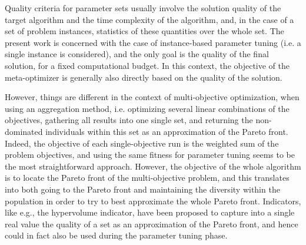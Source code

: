 \documentclass{llncs}
\begin{document}
Quality criteria for parameter sets usually involve the solution quality of the target algorithm and the time complexity of the algorithm, and, in the case of a set of problem instances, statistics of these quantities over the whole set. The present work is concerned with the case of instance-based parameter tuning (i.e. a single instance is considered), and the only goal is the quality of the final solution, for a fixed computational budget. In this context, the objective of the meta-optimizer is generally also directly based on the quality of the solution.

However, things are different in the context of multi-objective optimization, when using an aggregation method, i.e. optimizing several linear combinations of the objectives, gathering all results into one single set, and returning the non-dominated individuals within this set as an approximation of the Pareto front. Indeed, the objective of each single-objective run is the weighted sum of the problem objectives, and using the same fitness for parameter tuning seems to be the most straightforward approach. However, the objective of the whole algorithm is to locate the Pareto front of the multi-objective problem, and this translates into both going to the Pareto front and maintaining the diversity within the population in order to try to best approximate the whole Pareto front. Indicators, like e.g., the hypervolume indicator\cite{Zitzler2004}, have been proposed to capture into a single real value the quality of a set as an approximation of the Pareto front, and hence could in fact also be used during the 
parameter tuning phase.
\end{document}
